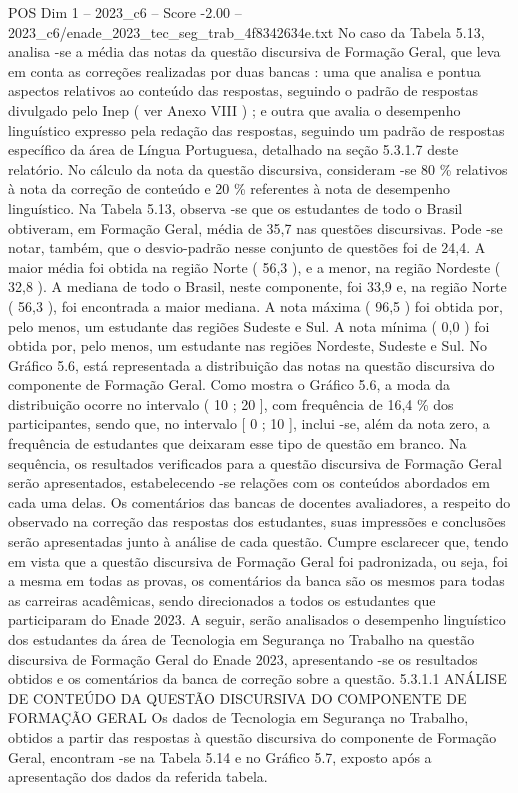\begin{textsample}{POS Dim 1 – 2023\_c6 – Score -2.00 – 2023\_c6/enade\_2023\_tec\_seg\_trab\_4f8342634e.txt}
No caso da Tabela 5.13, analisa -se a média das notas da questão discursiva de Formação Geral, que leva em conta as correções realizadas por duas bancas : uma que analisa e pontua aspectos relativos ao conteúdo das respostas, seguindo o padrão de respostas divulgado pelo Inep ( ver Anexo VIII ) ; e outra que avalia o desempenho linguístico expresso pela redação das respostas, seguindo um padrão de respostas específico da área de Língua Portuguesa, detalhado na seção 5.3.1.7 deste relatório.
No cálculo da nota da questão discursiva, consideram -se 80 \% relativos à nota da correção de conteúdo e 20 \% referentes à nota de desempenho linguístico.
Na Tabela 5.13, observa -se que os estudantes de todo o Brasil obtiveram, em Formação Geral, média de 35,7 nas questões discursivas.
Pode -se notar, também, que o desvio-padrão nesse conjunto de questões foi de 24,4.
A maior média foi obtida na região Norte ( 56,3 ), e a menor, na região Nordeste ( 32,8 ).
A mediana de todo o Brasil, neste componente, foi 33,9 e, na região Norte ( 56,3 ), foi encontrada a maior mediana.
A nota máxima ( 96,5 ) foi obtida por, pelo menos, um estudante das regiões Sudeste e Sul.
A nota mínima ( 0,0 ) foi obtida por, pelo menos, um estudante nas regiões Nordeste, Sudeste e Sul.
No Gráfico 5.6, está representada a distribuição das notas na questão discursiva do componente de Formação Geral.
Como mostra o Gráfico 5.6, a moda da distribuição ocorre no intervalo ( 10 ; 20 ], com frequência de 16,4 \% dos participantes, sendo que, no intervalo [ 0 ; 10 ], inclui -se, além da nota zero, a frequência de estudantes que deixaram esse tipo de questão em branco.
Na sequência, os resultados verificados para a questão discursiva de Formação Geral serão apresentados, estabelecendo -se relações com os conteúdos abordados em cada uma delas.
Os comentários das bancas de docentes avaliadores, a respeito do observado na correção das respostas dos estudantes, suas impressões e conclusões serão apresentadas junto à análise de cada questão.
Cumpre esclarecer que, tendo em vista que a questão discursiva de Formação Geral foi padronizada, ou seja, foi a mesma em todas as provas, os comentários da banca são os mesmos para todas as carreiras acadêmicas, sendo direcionados a todos os estudantes que participaram do Enade 2023.
A seguir, serão analisados o desempenho linguístico dos estudantes da área de Tecnologia em Segurança no Trabalho na questão discursiva de Formação Geral do Enade 2023, apresentando -se os resultados obtidos e os comentários da banca de correção sobre a questão. 5.3.1.1 ANÁLISE DE CONTEÚDO DA QUESTÃO DISCURSIVA DO COMPONENTE DE FORMAÇÃO GERAL Os dados de Tecnologia em Segurança no Trabalho, obtidos a partir das respostas à questão discursiva do componente de Formação Geral, encontram -se na Tabela 5.14 e no Gráfico 5.7, exposto após a apresentação dos dados da referida tabela.

\end{textsample}
